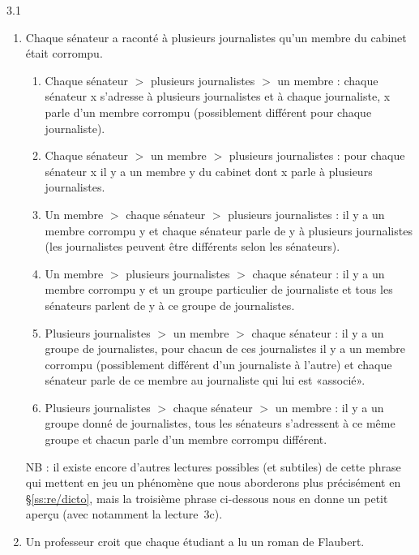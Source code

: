 \begin{Solution}{3.{1}}
\begin{enumerate}
\begin{enumerate}
\fussy
\end{enumerate}

\item
Chaque sénateur a raconté à plusieurs journalistes qu'un membre du
cabinet était corrompu.

\begin{enumerate}
\item Chaque sénateur $>$ plusieurs journalistes $>$ un membre :
chaque sénateur \Obj x s'adresse à plusieurs journalistes et à chaque journaliste, \Obj x parle d'un membre corrompu (possiblement différent pour chaque journaliste).

\item Chaque sénateur $>$ un membre $>$ plusieurs journalistes :
pour chaque sénateur \Obj x il y a un membre \Obj y du cabinet dont \Obj x parle à plusieurs journalistes.

\item  Un membre $>$ chaque sénateur $>$ plusieurs journalistes :
il y a un membre corrompu \Obj y et chaque sénateur parle de \Obj y à plusieurs journalistes (les journalistes peuvent être différents selon les sénateurs).

\item  Un membre $>$ plusieurs journalistes $>$ chaque sénateur :
il y a un membre corrompu \Obj y et un groupe particulier de journaliste et tous les sénateurs parlent de \Obj y à ce groupe de journalistes.

\item  Plusieurs journalistes $>$ un membre $>$ chaque sénateur :
il y a un groupe de journalistes, pour chacun de ces journalistes il y a un membre corrompu (possiblement différent d'un journaliste à l'autre) et chaque sénateur parle de ce membre au journaliste qui lui est «associé».

\item  Plusieurs journalistes $>$ chaque sénateur $>$ un membre :
il y a un groupe donné de journalistes, tous les sénateurs s'adressent à ce même groupe et chacun parle d'un membre corrompu différent.

\end{enumerate}

NB : il existe encore d'autres lectures possibles (et subtiles) de cette phrase qui mettent en jeu un phénomène que nous aborderons plus précisément en \S\ref{ss:re/dicto}, mais la troisième phrase ci-dessous nous en donne un petit aperçu (avec notamment la lecture~3c).

\item
Un professeur croit que chaque étudiant a lu un roman de Flaubert.


\end{enumerate}
\end{Solution}
